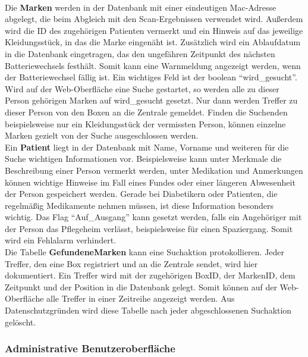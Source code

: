 \\Die \textbf{Marken} werden in der Datenbank mit einer eindeutigen Mac-Adresse abgelegt, die beim Abgleich mit den Scan-Ergebnissen verwendet wird. Außerdem wird die ID des zugehörigen Patienten vermerkt und ein Hinweis auf das jeweilige Kleidungsstück, in das die Marke eingenäht ist. Zusätzlich wird ein Ablaufdatum in die Datenbank eingetragen, das den ungefähren Zeitpunkt des nächsten Batteriewechsels festhält. Somit kann eine Warnmeldung angezeigt werden, wenn der Batteriewechsel fällig ist. Ein wichtiges Feld ist der boolean \enquote{wird\_gesucht}. Wird auf der Web-Oberfläche eine Suche gestartet, so werden alle zu dieser Person gehörigen Marken auf wird\_gesucht gesetzt. Nur dann werden Treffer zu dieser Person von den Boxen an die Zentrale gemeldet. Finden die Suchenden beispielsweise nur ein Kleidungsstück der vermissten Person, können einzelne Marken gezielt von der Suche ausgeschlossen werden. 
\\Ein \textbf{Patient} liegt in der Datenbank mit Name, Vorname und weiteren für die Suche wichtigen Informationen vor. Beispielsweise kann unter Merkmale die Beschreibung einer Person vermerkt werden, unter Medikation und Anmerkungen können wichtige Hinweise im Fall eines Fundes oder einer längeren Abwesenheit der Person gespeichert werden. Gerade bei Diabetikern oder Patienten, die regelmäßig Medikamente nehmen müssen, ist diese Information besonders wichtig. Das Flag \enquote{Auf\_Ausgang} kann gesetzt werden, falls ein Angehöriger mit der Person das Pflegeheim verlässt, beispielsweise für einen Spaziergang. Somit wird ein Fehlalarm verhindert.
\\Die Tabelle \textbf{GefundeneMarken} kann eine Suchaktion protokollieren. Jeder Treffer, den eine Box registriert und an die Zentrale sendet, wird hier dokumentiert. Ein Treffer wird mit der zugehörigen BoxID, der MarkenID, dem Zeitpunkt und der Position in die Datenbank gelegt. Somit können auf der Web-Oberfläche alle Treffer in einer Zeitreihe angezeigt werden. Aus Datenschutzgründen wird diese Tabelle nach jeder abgeschlossenen Suchaktion gelöscht.

\subsubsection{Administrative Benutzeroberfläche}
